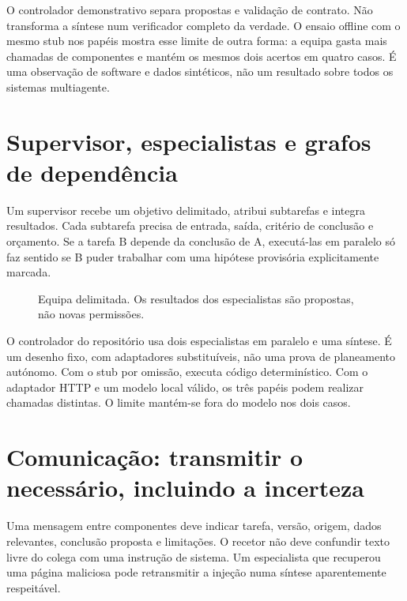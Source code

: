 O controlador demonstrativo separa propostas e validação de contrato. Não transforma a síntese num verificador completo da verdade. O ensaio offline com o mesmo stub nos papéis mostra esse limite de outra forma: a equipa gasta mais chamadas de componentes e mantém os mesmos dois acertos em quatro casos. É uma observação de software e dados sintéticos, não um resultado sobre todos os sistemas multiagente.

\section{Supervisor, especialistas e grafos de dependência}
Um supervisor recebe um objetivo delimitado, atribui subtarefas e integra resultados. Cada subtarefa precisa de entrada, saída, critério de conclusão e orçamento. Se a tarefa B depende da conclusão de A, executá-las em paralelo só faz sentido se B puder trabalhar com uma hipótese provisória explicitamente marcada.

\begin{figure}[htbp]
\centering
{}
\caption{Equipa delimitada. Os resultados dos especialistas são propostas, não novas permissões.}
\label{fig:equipa}
\end{figure}

O controlador do repositório usa dois especialistas em paralelo e uma síntese. É um desenho fixo, com adaptadores substituíveis, não uma prova de planeamento autónomo. Com o stub por omissão, executa código determinístico. Com o adaptador HTTP e um modelo local válido, os três papéis podem realizar chamadas distintas. O limite mantém-se fora do modelo nos dois casos.

\section{Comunicação: transmitir o necessário, incluindo a incerteza}
Uma mensagem entre componentes deve indicar tarefa, versão, origem, dados relevantes, conclusão proposta e limitações. O recetor não deve confundir texto livre do colega com uma instrução de sistema. Um especialista que recuperou uma página maliciosa pode retransmitir a injeção numa síntese aparentemente respeitável.

